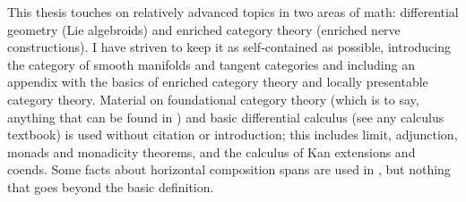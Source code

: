 
This thesis touches on relatively advanced topics in two areas of math: differential geometry (Lie algebroids) and enriched category theory (enriched nerve constructions).
I have striven to keep it as self-contained as possible, introducing the category of smooth manifolds and tangent categories and including an appendix with the basics of enriched category theory and locally presentable category theory. Material on foundational category theory (which is to say, anything that can be found in \cite{MacLane1988}) and basic differential calculus (see any calculus textbook) is used without citation or introduction; this includes limit, adjunction, monads and monadicity theorems, and the calculus of Kan extensions and coends. Some facts about horizontal composition spans are used in , but nothing that goes beyond the basic definition.

